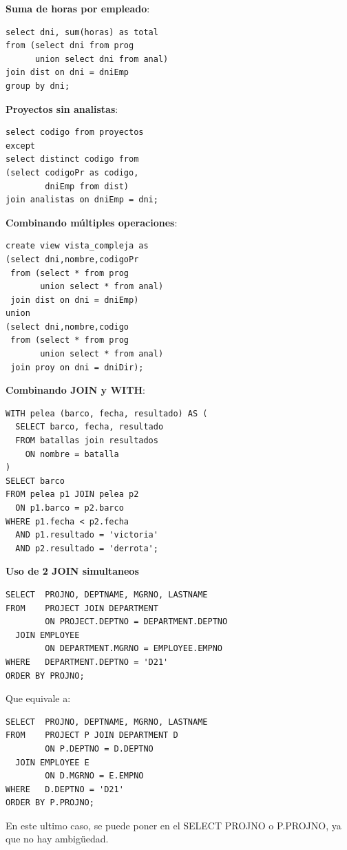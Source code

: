 \documentclass[10pt,a4paper,twocolumn]{article}
\begin{document}
\textbf{Suma de horas por empleado}:
\begin{lstlisting}
select dni, sum(horas) as total
from (select dni from prog 
      union select dni from anal)
join dist on dni = dniEmp
group by dni;
\end{lstlisting}

\textbf{Proyectos sin analistas}:
\begin{lstlisting}
select codigo from proyectos
except
select distinct codigo from
(select codigoPr as codigo,
        dniEmp from dist)
join analistas on dniEmp = dni;
\end{lstlisting}

\textbf{Combinando múltiples operaciones}:
\begin{lstlisting}
create view vista_compleja as
(select dni,nombre,codigoPr 
 from (select * from prog 
       union select * from anal)
 join dist on dni = dniEmp)
union
(select dni,nombre,codigo 
 from (select * from prog 
       union select * from anal)
 join proy on dni = dniDir);
\end{lstlisting}

\textbf{Combinando JOIN y WITH}:
\begin{lstlisting}
WITH pelea (barco, fecha, resultado) AS (
  SELECT barco, fecha, resultado
  FROM batallas join resultados
    ON nombre = batalla
)
SELECT barco
FROM pelea p1 JOIN pelea p2
  ON p1.barco = p2.barco
WHERE p1.fecha < p2.fecha
  AND p1.resultado = 'victoria'
  AND p2.resultado = 'derrota';
\end{lstlisting}

\textbf{Uso de 2 JOIN simultaneos}
\begin{lstlisting}
SELECT  PROJNO, DEPTNAME, MGRNO, LASTNAME
FROM    PROJECT JOIN DEPARTMENT
        ON PROJECT.DEPTNO = DEPARTMENT.DEPTNO
  JOIN EMPLOYEE
        ON DEPARTMENT.MGRNO = EMPLOYEE.EMPNO
WHERE   DEPARTMENT.DEPTNO = 'D21'
ORDER BY PROJNO;
\end{lstlisting}
Que equivale a:
\begin{lstlisting}
SELECT  PROJNO, DEPTNAME, MGRNO, LASTNAME
FROM    PROJECT P JOIN DEPARTMENT D
        ON P.DEPTNO = D.DEPTNO
  JOIN EMPLOYEE E
        ON D.MGRNO = E.EMPNO
WHERE   D.DEPTNO = 'D21'
ORDER BY P.PROJNO;
\end{lstlisting}
En este ultimo caso, se puede poner en el SELECT PROJNO o P.PROJNO, ya que no hay ambigüedad.
\end{document}
